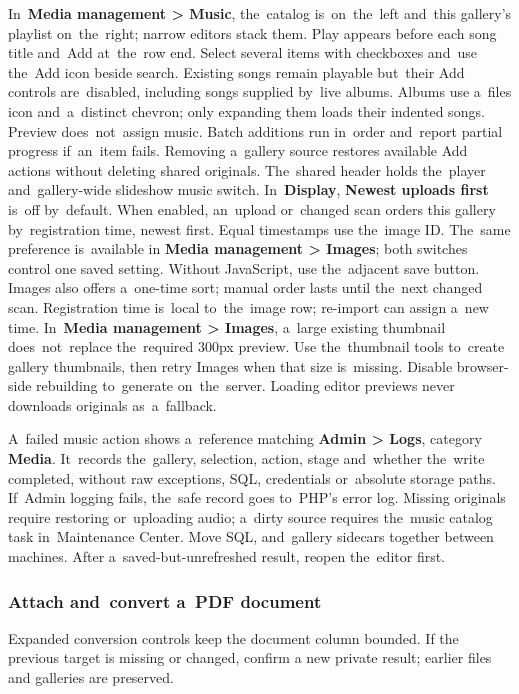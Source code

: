 \documentclass[11pt,a4paper]{article}
\newcommand{\filepath}[1]{\path{#1}}
\newcommand{\ui}[1]{\textbf{#1}}
\begin{document}
In~\ui{Media management > Music}, the~catalog is~on~the~left and~this
gallery's playlist on~the~right; narrow editors stack them. Play appears
before each song title and~Add at~the~row end. Select several items with
checkboxes and~use the~Add icon beside search. Existing songs remain playable
but~their Add controls are~disabled, including songs supplied by~live albums.
Albums use a~files icon and~a~distinct chevron; only expanding them loads
their indented songs. Preview does~not~assign music. Batch additions run
in~order and~report partial progress if~an~item fails. Removing a~gallery
source restores available Add actions without deleting shared originals.
The~shared header holds the~player and~gallery-wide slideshow music switch.
In~\ui{Display}, \ui{Newest uploads first} is~off by~default. When enabled,
an~upload or~changed scan orders this gallery by~registration time, newest
first. Equal timestamps use the~image ID. The~same preference is~available in
\ui{Media management > Images}; both switches control one saved setting.
Without JavaScript, use the~adjacent save button. Images also offers a~one-time sort; manual order lasts until the~next changed scan.
Registration time is~local to~the~image row; re-import can assign a~new time.
In~\ui{Media management > Images}, a~large
existing thumbnail does~not~replace the~required 300px preview. Use
the~thumbnail tools to~create gallery thumbnails, then retry Images when
that size is~missing. Disable browser-side rebuilding to~generate on~the~server.
Loading editor previews never downloads originals as~a~fallback.

A~failed music action shows a~reference matching \ui{Admin > Logs},
category \ui{Media}. It~records the~gallery, selection, action, stage
and~whether the~write completed, without raw exceptions, SQL, credentials
or~absolute storage paths. If~Admin logging fails, the~safe record goes
to~PHP's error log. Missing originals require restoring or~uploading audio;
a~dirty source requires the~music catalog task in~Maintenance Center.
Move SQL, \filepath{data/music/} and~gallery sidecars together between
machines. After a~saved-but-unrefreshed result, reopen the~editor first.

\subsubsection{Attach and~convert a~PDF document}
Expanded conversion controls keep the document column bounded. If the previous
target is missing or changed, confirm a new private result; earlier files and
galleries are preserved.
\end{document}

